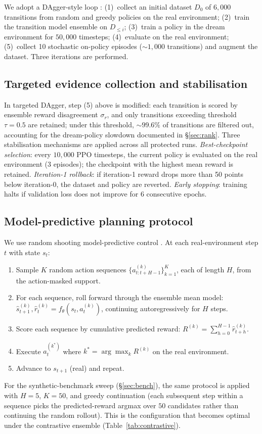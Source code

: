 \documentclass[11pt]{article}
\begin{document}
We adopt a DAgger-style loop \citep{ross2011reduction}: (1)~collect an initial dataset $D_0$ of $6{,}000$ transitions from random and greedy policies on the real environment; (2)~train the transition model ensemble on $D_{\leq i}$; (3)~train a policy in the dream environment for $50{,}000$ timesteps; (4)~evaluate on the real environment; (5)~collect 10 stochastic on-policy episodes ($\sim$$1{,}000$ transitions) and augment the dataset. Three iterations are performed.

\subsection{Targeted evidence collection and stabilisation}

In targeted DAgger, step (5) above is modified: each transition is scored by ensemble reward disagreement $\sigma_r$, and only transitions exceeding threshold $\tau = 0.5$ are retained; under this threshold, $\sim$$99.6\%$ of transitions are filtered out, accounting for the dream-policy slowdown documented in \S\ref{sec:rank}. Three stabilisation mechanisms are applied across all protected runs. \emph{Best-checkpoint selection}: every $10{,}000$ PPO timesteps, the current policy is evaluated on the real environment (3 episodes); the checkpoint with the highest mean reward is retained. \emph{Iteration-1 rollback}: if iteration-1 reward drops more than 50 points below iteration-0, the dataset and policy are reverted. \emph{Early stopping}: training halts if validation loss does not improve for 6 consecutive epochs.

\subsection{Model-predictive planning protocol}\label{sec:methods-mpc}

We use random shooting model-predictive control \citep{garcia1989model,williams2017model,rubinstein1999cross}. At each real-environment step $t$ with state $s_t$:
\begin{enumerate}
\item Sample $K$ random action sequences $\{a^{(k)}_{t:t+H-1}\}_{k=1}^K$, each of length $H$, from the action-masked support.
\item For each sequence, roll forward through the ensemble mean model: $\hat{s}^{(k)}_{t+1}, \hat{r}^{(k)}_t = f_\theta(s_t, a^{(k)}_t)$, continuing autoregressively for $H$ steps.
\item Score each sequence by cumulative predicted reward: $R^{(k)} = \sum_{h=0}^{H-1} \hat{r}^{(k)}_{t+h}$.
\item Execute $a^{(k^*)}_{t}$ where $k^* = \arg\max_k R^{(k)}$ on the real environment.
\item Advance to $s_{t+1}$ (real) and repeat.
\end{enumerate}
For the synthetic-benchmark sweep (\S\ref{sec:bench}), the same protocol is applied with $H{=}5$, $K{=}50$, and greedy continuation (each subsequent step within a sequence picks the predicted-reward argmax over $50$ candidates rather than continuing the random rollout). This is the configuration that becomes optimal under the contrastive ensemble (Table~\ref{tab:contrastive}).
\end{document}
